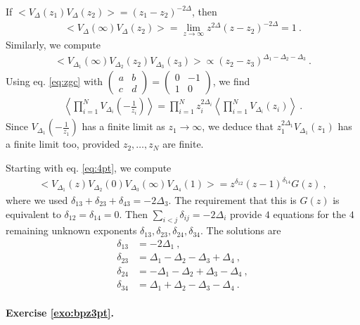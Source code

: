 \documentclass[12pt, a4paper]{article}
\theoremstyle{break}
\begin{document}
If $\Big<V_\Delta(z_1)V_\Delta(z_2)\Big> = (z_1-z_2)^{-2\Delta}$, then
\begin{align}
 \Big<V_\Delta(\infty)V_\Delta(z_2)\Big> = \lim_{z\to\infty} z^{2\Delta}(z-z_2)^{-2\Delta}=1 \ .
\end{align}
Similarly, we compute 
\begin{align}
 \Big<V_{\Delta_1}(\infty)V_{\Delta_2}(z_2)V_{\Delta_3}(z_3)\Big> \propto (z_2-z_3)^{\Delta_1-\Delta_2-\Delta_3}\ .
\end{align}
Using eq. \eqref{eq:zgc} with $\left(\begin{smallmatrix} a & b \\ c & d \end{smallmatrix} \right) = \left(\begin{smallmatrix} 0 & -1 \\ 1 & 0 \end{smallmatrix}\right)$, we find 
\begin{align}
 \left< \prod_{i=1}^N  V_{\Delta_i}\left(-\tfrac{1}{z_i}\right) \right>
 = \prod_{i=1}^N z_i^{2\Delta_i} \left< \prod_{i=1}^N V_{\Delta_i}(z_i) \right>\ .
\end{align}
Since $V_{\Delta_1}(-\frac{1}{z_1})$ has a finite limit as $z_1\to \infty$, we deduce that $z_1^{2\Delta_1}V_{\Delta_1}(z_1)$ has a finite limit too, provided $z_2,\dots, z_N$ are finite.

Starting with eq. \eqref{eq:4pt}, we compute 
\begin{align}
 \Big< V_{\Delta_1}(z) V_{\Delta_2}(0)V_{\Delta_3}(\infty)V_{\Delta_4}(1) \Big> = z^{\delta_{12}}(z-1)^{\delta_{14}} G(z)\ ,
\end{align}
where we used $\delta_{13}+\delta_{23}+\delta_{43}=-2\Delta_3$. The requirement that this is $G(z)$ is equivalent to  $\delta_{12}=\delta_{14}=0$. Then $\sum_{i<j}\delta_{ij}=-2\Delta_i$ provide $4$ equations for the $4$ remaining unknown exponents $\delta_{13}, \delta_{23}, \delta_{24}, \delta_{34}$. The solutions are 
\begin{align}
\delta_{13} &= -2\Delta_1\ ,
\\
 \delta_{23} &= \Delta_1-\Delta_2-\Delta_3+\Delta_4 \ ,
 \\
 \delta_{24} &= -\Delta_1-\Delta_2+\Delta_3-\Delta_4\ ,
 \\
 \delta_{34} &= \Delta_1+\Delta_2-\Delta_3-\Delta_4\ .
\end{align}

\paragraph{Exercise \ref{exo:bpz3pt}.} 
\end{document}
